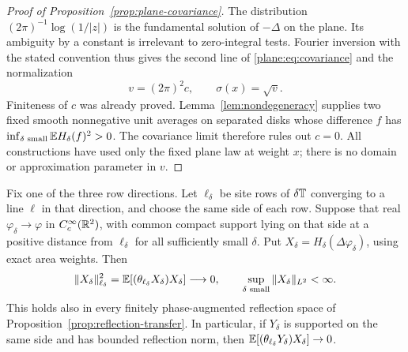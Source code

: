 \begin{proof}[Proof of Proposition~\ref{prop:plane-covariance}]
The distribution $(2\pi)^{-1}\log(1/|z|)$ is the fundamental
solution of $-\Delta$ on the plane.  Its ambiguity by a constant is
irrelevant to zero-integral tests.  Fourier inversion with the stated
convention thus gives the second line of \eqref{plane:eq:covariance}
and the normalization
\begin{equation}
 \label{plane:eq:normalization}
 v=(2\pi)^2c,\qquad \sigma(x)=\sqrt v.
\end{equation}
Finiteness of $c$ was already proved.  Lemma~\ref{lem:nondegeneracy}
supplies two fixed smooth nonnegative unit averages on separated
disks whose difference $f$ has
$\inf_{\delta\text{ small}}\mathbb E H_\delta(f)^2>0$.
The covariance limit therefore rules out $c=0$.
All constructions have used only the fixed plane law at weight $x$;
there is no domain or approximation parameter in $v$.
\end{proof}

\begin{proposition}
\label{prop:reflection-null}
Fix one of the three row directions.  Let $\ell_\delta$ be site rows
of $\delta\mathbb T$ converging to a line $\ell$ in that direction, and
choose the same side of each row.  Suppose that real
$\varphi_\delta\to\varphi$ in $C_c^\infty(\mathbb R^2)$, with common
compact support lying on that side at a positive distance from
$\ell_\delta$ for all sufficiently small $\delta$.  Put
$X_\delta=H_\delta(\Delta\varphi_\delta)$, using exact area weights.
Then
\begin{equation}
 \label{plane:eq:reflection-null}
 \|X_\delta\|_{\ell_\delta}^2
   =\mathbb E[(\theta_{\ell_\delta}X_\delta)X_\delta]
       \longrightarrow0,
 \qquad \sup_{\delta\text{ small}}\|X_\delta\|_{L^2}<\infty.
\end{equation}
This holds also in every finitely phase-augmented reflection space of
Proposition~\ref{prop:reflection-transfer}.  In particular, if
$Y_\delta$ is supported on the same side and has bounded reflection
norm, then
$\mathbb E[(\theta_{\ell_\delta}Y_\delta)X_\delta]\to0$.
\end{proposition}

